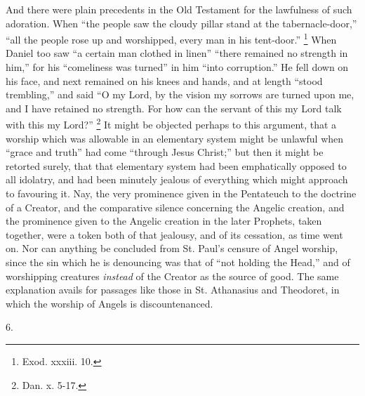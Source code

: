 And there were plain precedents in the Old Testament
for the lawfulness of such adoration. When ``the
people saw the cloudy pillar stand at the
tabernacle-door,'' ``all the people rose up and
worshipped, every man in his tent-door.'' \footnote{Exod. xxxiii. 10.} When
Daniel too saw ``a certain man clothed in linen''
``there remained no strength in him,'' for his
``comeliness was turned'' in him ``into
corruption.'' He fell down on his face, and next
remained on his knees and hands, and at length
``stood trembling,'' and said ``O my Lord, by
the vision my sorrows are turned upon me, and I have
retained no strength. For how can the servant of this my
Lord talk with this my Lord?'' \footnote{Dan. x. 5-17.} It might be objected perhaps
to this argument, that a worship which was allowable in
an elementary system might be unlawful when ``grace
and truth'' had come ``through Jesus
Christ;'' but then it might be retorted surely, that
that elementary system had been emphatically opposed to
all idolatry, and had been minutely jealous of everything
which might approach to favouring it. Nay, the very
prominence given in the Pentateuch to the doctrine of a
Creator, and the comparative silence concerning the
Angelic creation, and the prominence given to the Angelic
creation in the later Prophets, taken together, were a
token both of that jealousy, and of its cessation, as
time went on. Nor can anything be concluded from St.
Paul's censure of Angel worship, since the sin which he
is denouncing was that of ``not holding the
Head,'' and of worshipping creatures \emph{instead}
of the Creator as the source of good. The same
explanation avails for passages like those in St.
Athanasius and Theodoret, in which the worship of Angels
is discountenanced.

6.

